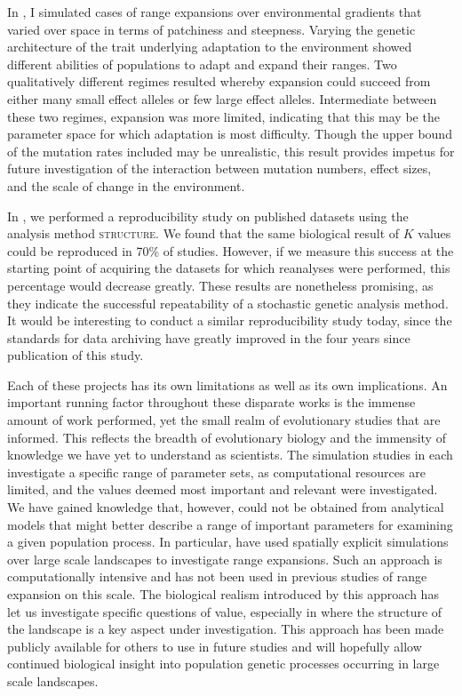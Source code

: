 In , I simulated cases of range expansions over environmental gradients that varied over space in terms of patchiness and steepness. Varying the genetic architecture of the trait underlying adaptation to the environment showed different abilities of populations to adapt and expand their ranges. Two qualitatively different regimes resulted whereby expansion could succeed from either many small effect alleles or few large effect alleles. Intermediate between these two regimes, expansion was more limited, indicating that this may be the parameter space for which adaptation is most difficulty. Though the upper bound of the mutation rates included may be unrealistic, this result provides impetus for future investigation of the interaction between mutation numbers, effect sizes, and the scale of change in the environment.

In , we performed a reproducibility study on published datasets using the analysis method \textsc{structure}. We found that the same biological result of $K$ values could be reproduced in 70\% of studies. However, if we measure this success at the starting point of acquiring the datasets for which reanalyses were performed, this percentage would decrease greatly. These results are nonetheless promising, as they indicate the successful repeatability of a stochastic genetic analysis method. It would be interesting to conduct a similar reproducibility study today, since the standards for data archiving have greatly improved in the four years since publication of this study.

Each of these projects has its own limitations as well as its own implications. An important running factor throughout these disparate works is the immense amount of work performed, yet the small realm of evolutionary studies that are informed. This reflects the breadth of evolutionary biology and the immensity of knowledge we have yet to understand as scientists. The simulation studies in  each investigate a specific range of parameter sets, as computational resources are limited, and the values deemed most important and relevant were investigated. We have gained knowledge that, however, could not be obtained from analytical models that might better describe a range of important parameters for examining a given population process. In particular,  have used spatially explicit simulations over large scale landscapes to investigate range expansions. Such an approach is computationally intensive and has not been used in previous studies of range expansion on this scale. The biological realism introduced by this approach has let us investigate specific questions of value, especially in  where the structure of the landscape is a key aspect under investigation. This approach has been made publicly available for others to use in future studies and will hopefully allow continued biological insight into population genetic processes occurring in large scale landscapes.

